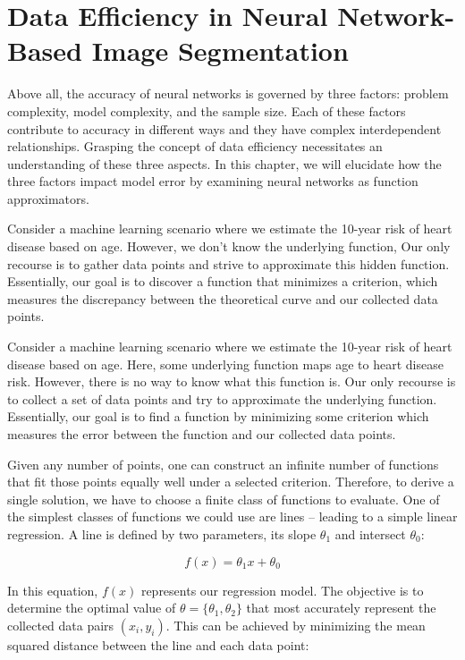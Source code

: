 
\chapter{Data Efficiency in Neural Network-Based Image Segmentation}
\label{chap:data-efficiency}

Above all, the accuracy of neural networks is governed by three factors: problem complexity, model complexity, and the sample size. Each of these factors contribute to accuracy in different ways and they have complex interdependent relationships. Grasping the concept of data efficiency necessitates an understanding of these three aspects. In this chapter, we will elucidate how the three factors impact model error by examining neural networks as function approximators.

Consider a machine learning scenario where we estimate the 10-year risk of heart disease based on age. However, we don't know the underlying function, Our only recourse is to gather data points and strive to approximate this hidden function. Essentially, our goal is to discover a function that minimizes a criterion, which measures the discrepancy between the theoretical curve and our collected data points.

Consider a machine learning scenario where we estimate the 10-year risk of heart disease based on age. Here, some underlying function maps age to heart disease risk. However, there is no way to know what this function is. Our only recourse is to collect a set of data points and try to approximate the underlying function. Essentially, our goal is to find a function by minimizing some criterion which measures the error between the function and our collected data points.

Given any number of points, one can construct an infinite number of functions that fit those points equally well under a selected criterion. Therefore, to derive a single solution, we have to choose a finite class of functions to evaluate. One of the simplest classes of functions we could use are lines -- leading to a simple linear regression. A line is defined by two parameters, its slope $\theta_1$ and intersect $\theta_0$:

\begin{equation}
	f(x) = \theta_1 x + \theta_0
\end{equation}

In this equation, $f(x)$ represents our regression model. The objective is to determine the optimal value of $\theta = \{ \theta_1, \theta_2 \}$ that most accurately represent the collected data pairs $(x_i, y_i)$. This can be achieved by minimizing the mean squared distance between the line and each data point:


